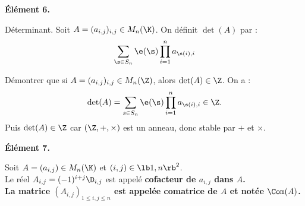 \documentclass[11pt]{article}
\begin{document}
\begin{center}
    \bf{Élément 6.}
\end{center}

\begin{defi}{Déterminant.}{}
    Soit $A=(a_{i,j})_{i,j}\in M_n(\K)$. On définit $\det(A)$ par :
    \begin{equation*}
        \sum_{\s\in S_n}\e(\s)\prod_{i=1}^na_{\s(i),i}
    \end{equation*}
\end{defi}

\vspace*{-0.4cm}

\begin{ex}{}{}
    Démontrer que si $A=(a_{i,j})_{i,j}\in M_n(\Z)$, alors $\det(A)\in\Z$.
    \tcblower
    On a :
    \begin{equation*}
        \det(A)=\sum_{s\in S_n}\e(\s)\prod_{i=1}^na_{\s(i),i} \in \Z.
    \end{equation*}
    Puis $\det(A) \in \Z$ car $(\Z, +, \times)$ est un anneau, donc stable par $+$ et $\times$.
\end{ex}

\begin{center}
    \bf{Élément 7.}
\end{center}

\begin{defi}{}{}
    Soit $A=(a_{i,j})\in M_n(\K)$ et $(i,j)\in\lb1,n\rb^2$.\\
    Le réel $A_{i,j}=(-1)^{i+j}\D_{i,j}$ est appelé \bf{cofacteur} de $a_{i,j}$ dans $A$.\\
    La matrice $(A_{i,j})_{1\leq i,j \leq n}$ est appelée \bf{comatrice} de $A$ et notée $\Com(A)$.
\end{defi}

\pagebreak
\end{document}
